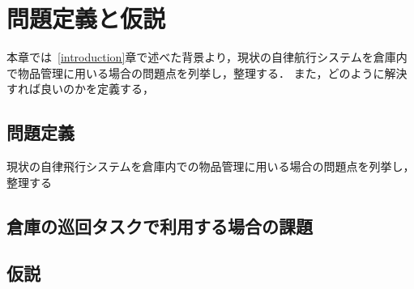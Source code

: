 \chapter{問題定義と仮説}
\label{issue}
本章では~\ref{introduction}章で述べた背景より，現状の自律航行システムを倉庫内で物品管理に用いる場合の問題点を列挙し，整理する．
また，どのように解決すれば良いのかを定義する，

\section{問題定義}
現状の自律飛行システムを倉庫内での物品管理に用いる場合の問題点を列挙し，整理する

\section{倉庫の巡回タスクで利用する場合の課題}




\section{仮説}




